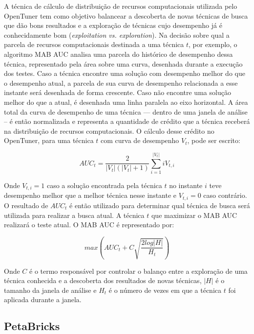 \documentclass[a4paper, 12pt]{article}
\begin{document}
A técnica de cálculo de distribuição de recursos computacionais utilizada
pelo OpenTuner tem como objetivo balancear a descoberta de novas técnicas
de busca que dão bons resultados e a exploração de técnicas cujo desempenho
já é conhecidamente bom (\emph{exploitation vs. exploration}). Na decisão sobre
qual a parcela de recursos computacionais destinada a uma técnica $t$, por
exemplo, o algoritmo MAB AUC analisa uma parcela do histórico de desempenho
dessa técnica, representado pela área sobre uma curva, desenhada durante a
execução dos testes. Caso a técnica encontre uma solução com desempenho melhor
do que o desempenho atual, a parcela de sua curva de desempenho relacionada a
esse instante será desenhada de forma crescente. Caso não encontre uma solução
melhor do que a atual, é desenhada uma linha paralela ao eixo horizontal. A
área total da curva de desempenho de uma técnica --- dentro de uma janela de
análise -- é então normalizada e representa a quantidade de crédito que a
técnica receberá na distribuição de recursos computacionais. O cálculo desse
crédito no OpenTuner, para uma técnica $t$ com curva de desempenho $V_t$, pode
ser escrito:

\begin{equation*}
    AUC_t = \frac{2} {|V_t|(|V_t|+1)} \sum_{i=1}^{|V_t|} iV_{t,i}
\end{equation*}

Onde $V_{t,i} = 1$ caso a solução encontrada pela técnica $t$ no instante
$i$ teve desempenho melhor que a melhor técnica nesse instante e
$V_{t,i} = 0$ caso contrário. O resultado de $AUC_t$ é então utilizado para
determinar qual técnica de busca será utilizada para realizar a busca atual.
A técnica $t$ que maximizar o MAB AUC realizará o teste atual. O MAB AUC é
representado por:

\begin{equation*}
    max \left( AUC_t + C\sqrt{\frac{2log|H|}{H_t}} \right)
\end{equation*}

Onde $C$ é o termo responsável por controlar o balanço entre a exploração de
uma técnica conhecida e a descoberta dos resultados de novas técnicas, $|H|$ é
o tamanho da janela de análise e $H_t$ é o número de vezes em que a técnica $t$
foi aplicada durante a janela.

\subsection{PetaBricks} \label{sec:peta}
\end{document}
